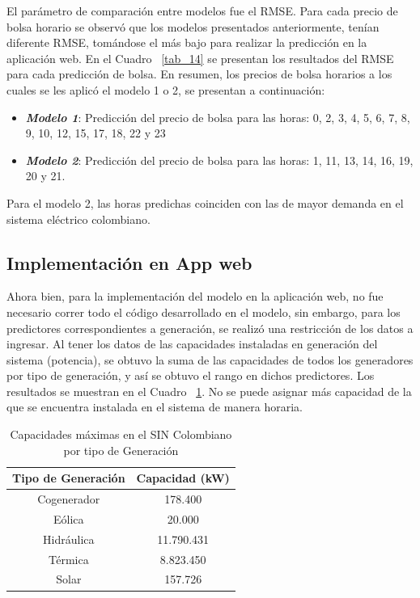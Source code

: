 \documentclass[conference, 10pt]{IEEEtran}
\begin{document}
El parámetro de comparación entre modelos fue el RMSE. Para cada precio de bolsa horario se observó que los modelos presentados anteriormente, tenían diferente RMSE, tomándose el más bajo para realizar la predicción en la aplicación web. En el Cuadro ~\ref{tab_14} se presentan los resultados del RMSE para cada predicción de bolsa. En resumen, los precios de bolsa horarios a los cuales se les aplicó el modelo 1 o 2, se presentan a continuación: 

\begin{itemize}
\item \textit{\textbf{Modelo 1}}: Predicción del precio de bolsa para las horas: 0, 2, 3, 4, 5, 6, 7, 8, 9, 10, 12, 15, 17, 18, 22 y 23
\item\textit{\textbf{Modelo 2}}: Predicción del precio de bolsa para las horas: 1, 11, 13, 14, 16, 19, 20 y 21.
\end{itemize}

Para el modelo 2, las horas predichas coinciden con las de mayor demanda en el sistema eléctrico colombiano. 

\subsection{Implementación en App web}
Ahora bien, para la implementación del modelo en la aplicación web, no fue necesario correr todo el código desarrollado en el modelo, sin embargo, para los predictores correspondientes a generación, se realizó una restricción de los datos a ingresar. Al tener los datos de las capacidades instaladas en generación del sistema (potencia), se obtuvo la suma de las capacidades de todos los generadores por tipo de generación, y así se obtuvo el rango en dichos predictores. Los resultados se muestran en el Cuadro ~\ref{tab_10}. No se puede asignar más capacidad de la que se encuentra instalada en el sistema de manera horaria.

\begin{table}[htbp]
\caption{Capacidades máximas en el SIN Colombiano por tipo de Generación}
\begin{center}
\begin{tabular}{|c|c|}
\hline
 Tipo de Generación&Capacidad (kW)\\
\hline 
Cogenerador&178.400\\
\hline
Eólica&20.000\\
\hline
Hidráulica&11.790.431\\
\hline
Térmica&8.823.450\\
\hline
Solar&157.726\\
  
	\hline
\end{tabular}
\label{tab_10}
\end{center}
\end{table}
  
\end{document}
